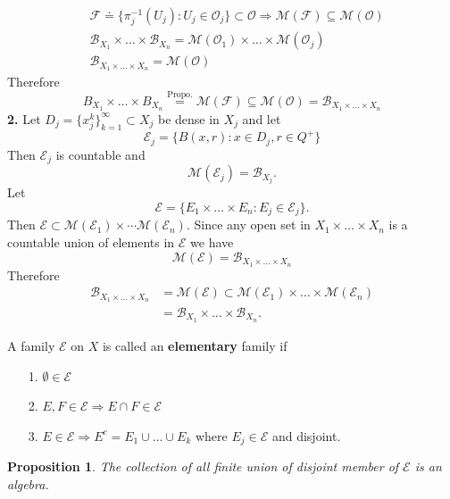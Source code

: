 \documentclass[12pt]{report}
\newtheorem{prop}[theorem]{Proposition}
\begin{document}
\begin{eqnarray*} &\mathcal{F} \doteq \{\pi_j^{-1} (U_j):
 U_j \in \mathcal{O}_j\}
\subset \mathcal{O}\Longrightarrow
\mathcal{M} (\mathcal{F}) 
 \subseteq \mathcal{M}(\mathcal{O})
\\  &\mathcal{B}_{X_1} \times \dots
\times  \mathcal{B}_{X_n} = \mathcal{M} (\mathcal{O}_1)
\times \dots\times \mathcal{M} (\mathcal{O}_j)\\
 &\mathcal{B}_{X_1 \times  \dots \times  X_n} =
\mathcal{M} (\mathcal{O})
\end{eqnarray*}
 Therefore 
\[ B_{X_1}\times  \dots \times  B_{X_n}\stackrel{\mbox{Propo.}}{=}
\mathcal{M} (\mathcal{F}) 
 \subseteq \mathcal{M}(\mathcal{O}) = \mathcal{B}_{X_1
\times  \dots\times  X_n}
\] {\bf 2.}  Let $D_j = \{x^k_j\}^\infty_{k=1} \subset X_j$ be dense in
$X_j$ and let
\[
\mathcal{E}_j = \{B(x, r): x \in D_j, r \in Q^+\}
\]  Then $\mathcal{E}_j$ is countable and 
\[
\mathcal{M} (\mathcal{E}_{j}) = \mathcal{B}_{X_j}.
\]  Let
\[
\mathcal{E} = \{E_1 \times  \dots \times  E_n:  E_j \in \mathcal{E}_j\}.
\]  
Then $\mathcal{E}\subset
\mathcal{M}(\mathcal{E}_1)\times\cdots
\mathcal{M}(\mathcal{E}_n)$.
Since any open set in $X_1 \times  \dots \times  X_n$ is a countable union
of elements in
$\mathcal{E}$ we have
\[
\mathcal{M} (\mathcal{E}) = \mathcal{B}_{X_1 \times  \dots
\times  X_n}
\]  Therefore
\begin{eqnarray*} 
\mathcal{B}_{X_1\times  \dots \times  X_n} &=
\mathcal{M}(\mathcal{E}) \subset\mathcal{M}({\mathcal{E}_1})
\times \dots \times  \mathcal{M}(\mathcal{E}_n)\\ &=\mathcal{B}_{X_1}
\times  \dots
\times  \mathcal{B}_{X_n}.
\end{eqnarray*}


A family $\mathcal{E}$ on $X$ is called an {\bf elementary} family if
\begin{itemize}
\item[1.]  $\emptyset \in \mathcal{E}$
\item[2.]  $E, F \in \mathcal{E} \Longrightarrow E \cap F \in
\mathcal{E}$
\item[3.]  $E \in \mathcal{E} \Longrightarrow E^c = E_1 \cup \dots
\cup E_k$ where $E_j \in \mathcal{E}$ and disjoint.
\end{itemize}


\begin{prop}  The collection of all finite union of disjoint member of
$\mathcal{E}$ is an algebra.
\end{prop}
\end{document}
